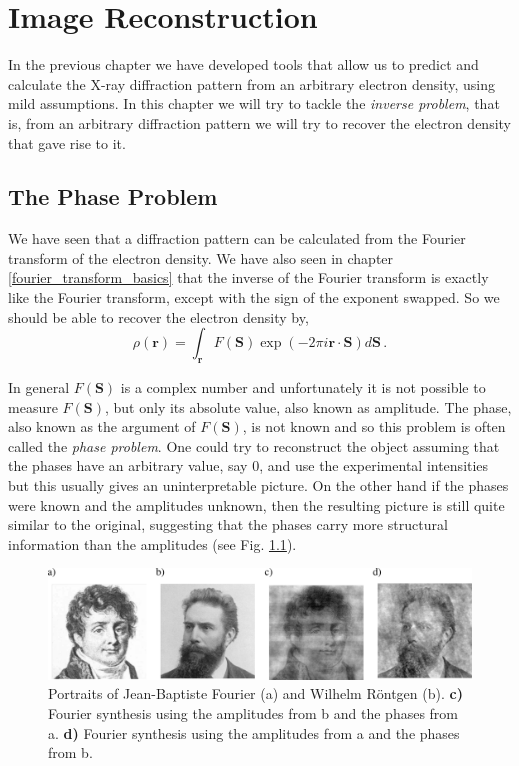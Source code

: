 \chapter{Image Reconstruction}\label{Image Reconstruction}\noindent

In the previous chapter we have developed tools that allow us to predict
and calculate the X-ray diffraction pattern from an arbitrary electron density,
using mild assumptions. In this chapter we will try to tackle the {\em inverse
  problem}, that is, from an arbitrary diffraction pattern we will try to
recover the electron density that gave rise to it.
\section{The Phase Problem}

We have seen that a diffraction pattern can be calculated from the Fourier
transform of the electron density. We have also seen in chapter
\ref{fourier_transform_basics} that the inverse of the Fourier transform is
exactly like the Fourier transform, except with the sign of the exponent
swapped. So we should be able to recover the electron density by,
\begin{equation}
\rho(\mathbf r) = \int_{\mathbf r} F(\mathbf S) \exp\left(-2
    \pi i \mathbf r \cdot \mathbf S \right) d\mathbf S\, .
\end{equation}

In general $F(\mathbf S)$ is a complex number and unfortunately it is not
possible to measure $F(\mathbf S)$, but only its absolute value, also known as
amplitude. The phase, also known as the argument of $F(\mathbf S)$, is not known and so
this problem is often called the {\em phase problem}. One could try to reconstruct the
object assuming that the phases have an arbitrary value, say 0, and use the
experimental intensities but this usually gives an uninterpretable picture. On
the other hand if the phases were known and the amplitudes unknown, then the
resulting picture is still quite similar to the original, suggesting that the
phases carry more structural information than the amplitudes (see Fig. \ref{Fig:PhaseSwapping}).
\begin{figure}[h]
  \centering
  \includegraphics[width=1 \columnwidth]{Image_Reconstruction/PhaseSwapping2.png}
  \caption{Portraits of Jean-Baptiste Fourier (a) and Wilhelm R\"{o}ntgen (b).
    {\bf c)} Fourier synthesis using the amplitudes from b and the phases from
    a. {\bf d)}
    Fourier synthesis using the amplitudes from a and the phases from b.}
  \label{Fig:PhaseSwapping}
\end{figure}

